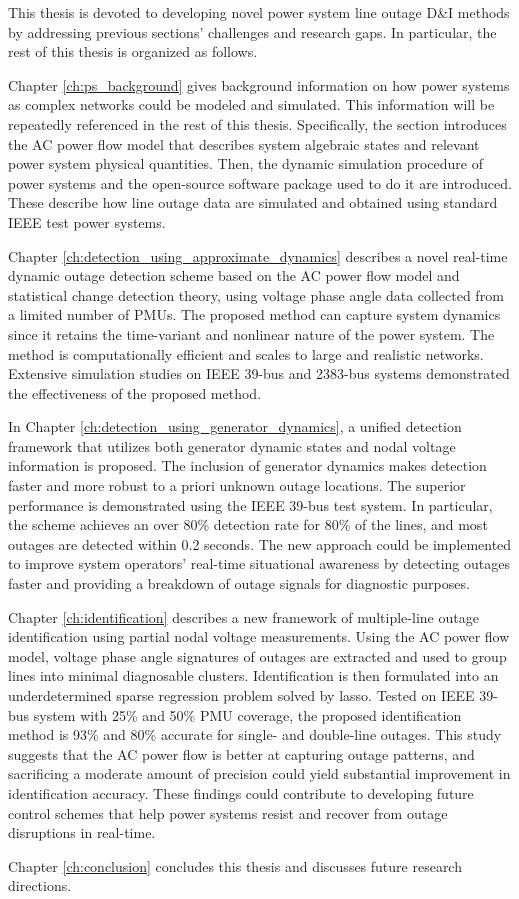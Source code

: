 This thesis is devoted to developing novel power system line outage D\&I methods by addressing previous sections' challenges and research gaps. In particular, the rest of this thesis is organized as follows.

Chapter \ref{ch:ps_background} gives background information on how power systems as complex networks could be modeled and simulated. This information will be repeatedly referenced in the rest of this thesis. Specifically, the section introduces the AC power flow model that describes system algebraic states and relevant power system physical quantities. Then, the dynamic simulation procedure of power systems and the open-source software package used to do it are introduced. These describe how line outage data are simulated and obtained using standard IEEE test power systems.


Chapter \ref{ch:detection_using_approximate_dynamics} describes a novel real-time dynamic outage detection scheme based on the AC power flow model and statistical change detection theory, using voltage phase angle data collected from a limited number of PMUs. The proposed method can capture system dynamics since it retains the time-variant and nonlinear nature of the power system. The method is computationally efficient and scales to large and realistic networks. Extensive simulation studies on IEEE 39-bus and 2383-bus systems demonstrated the effectiveness of the proposed method.

In Chapter \ref{ch:detection_using_generator_dynamics}, a unified detection framework that utilizes both generator dynamic states and nodal voltage information is proposed. The inclusion of generator dynamics makes detection faster and more robust to a priori unknown outage locations. The superior performance is demonstrated using the IEEE 39-bus test system. In particular, the scheme achieves an over 80\% detection rate for 80\% of the lines, and most outages are detected within 0.2 seconds. 
The new approach could be implemented to improve system operators' real-time situational awareness by detecting outages faster and providing a breakdown of outage signals for diagnostic purposes.

Chapter \ref{ch:identification} describes a new framework of multiple-line outage identification using partial nodal voltage measurements. Using the AC power flow model, voltage phase angle signatures of outages are extracted and used to group lines into minimal diagnosable clusters. Identification is then formulated into an underdetermined sparse regression problem solved by lasso. Tested on IEEE 39-bus system with 25\% and 50\% PMU coverage, the proposed identification method is 93\% and 80\% accurate for single- and double-line outages. 
This study suggests that the AC power flow is better at capturing outage patterns, and sacrificing a moderate amount of precision could yield substantial improvement in identification accuracy. These findings could contribute to developing future control schemes that help power systems resist and recover from outage disruptions in real-time.


Chapter \ref{ch:conclusion} concludes this thesis and discusses future research directions.
